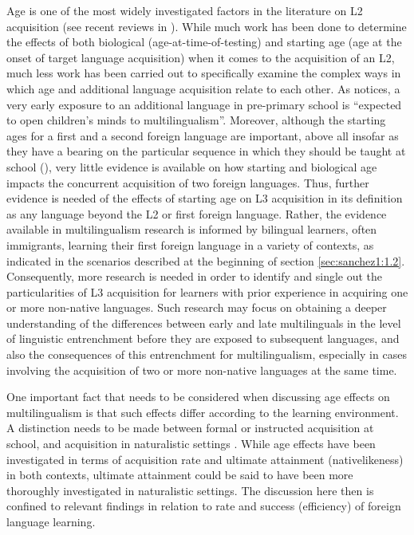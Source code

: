 \documentclass[output=paper,colorlinks,citecolor=brown,nonflat]{langsci/langscibook}
\begin{document}
Age is one of the most widely investigated factors in the literature on L2 acquisition (see recent reviews in \citealt{PfenningerSingleton2017, SingletonPfenninger2018, Muñoz2019, MuñozSingleton2019}). While much work has been done to determine the effects of both biological (age-at-time-of-testing) and starting age (age at the onset of target language acquisition) when it comes to the acquisition of an L2, much less work has been carried out to specifically examine the complex ways in which age and additional language acquisition relate to each other. As \citet[433]{Muñoz2019} notices, a very early exposure to an additional language in pre-primary school is “expected to open children’s minds to multilingualism”. Moreover, although the starting ages for a first and a second foreign language are important, above all insofar as they have a bearing on the particular sequence in which they should be taught at school (\citealt[222]{MuñozSingleton2019}), very little evidence is available on how starting and biological age impacts the concurrent acquisition of two foreign languages. Thus, further evidence is needed of the effects of starting age on L3 acquisition in its definition as any language beyond the L2 or first foreign language. Rather, the evidence available in multilingualism research is informed by bilingual learners, often immigrants, learning their first foreign language in a variety of contexts, as indicated in the scenarios described at the beginning of section \ref{sec:sanchez1:1.2}. Consequently, more research is needed in order to identify and single out the particularities of L3 acquisition for learners with prior experience in acquiring one or more non-native languages. Such research may focus on obtaining a deeper understanding of the differences between early and late multilinguals in the level of linguistic entrenchment before they are exposed to subsequent languages, and also the consequences of this entrenchment for multilingualism, especially in cases involving the acquisition of two or more non-native languages at the same time.

One important fact that needs to be considered when discussing age effects on multilingualism is that such effects differ according to the learning environment. A distinction needs to be made between formal or instructed acquisition at school, and acquisition in naturalistic settings \citep{Bardel2019}. While age effects have been investigated in terms of acquisition rate and ultimate attainment (nativelikeness) in both contexts, ultimate attainment could be said to have been more thoroughly investigated in naturalistic settings. The discussion here then is confined to relevant findings in relation to rate and success (efficiency) of foreign language learning.
\end{document}
